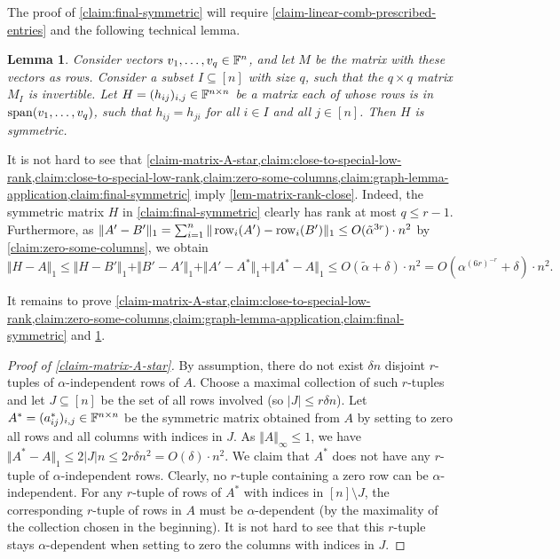 \documentclass{daj}
\theoremstyle{plain}
\theoremstyle{plain}
\newtheorem{lem}[thm]{Lemma}
\theoremstyle{plain}
\theoremstyle{plain}
\theoremstyle{definition}
\theoremstyle{plain}
\theoremstyle{plain}
\theoremstyle{definition}
\theoremstyle{definition}
\theoremstyle{plain}
\begin{document}
The proof of \cref{claim:final-symmetric} will require \cref{claim-linear-comb-prescribed-entries} and the following technical lemma.

\begin{lem}\label{lem:funny-matrix-symmetric}
Consider vectors $v_1,\dots, v_q\in \mathbb{F}^n$, and let $M$ be the matrix with these vectors as rows. Consider a subset $I\subseteq [n]$ with size $q$, such that the $q\times q$ matrix $M_I$ is invertible. Let $H=(h_{ij})_{i,j}\in \mathbb{F}^{n\times n}$ be a matrix each of whose rows is in $\operatorname{span}(v_1,\dots,v_q)$, such that $h_{ij}=h_{ji}$ for all $i\in I$ and all $j\in [n]$. Then $H$ is symmetric.
\end{lem}

It is not hard to see that \cref{claim-matrix-A-star,claim:close-to-special-low-rank,claim:close-to-special-low-rank,claim:zero-some-columns,claim:graph-lemma-application,claim:final-symmetric} imply \cref{lem-matrix-rank-close}. Indeed, the symmetric matrix $H$ in \cref{claim:final-symmetric} clearly has rank at most $q\leq r-1$. Furthermore, as $\Vert A'-B'\Vert_1=\sum_{i=1}^n \Vert \operatorname{row}_i(A')-\operatorname{row}_i(B')\Vert_1\leq  O(\tilde{\alpha}^{3r})\cdot n^2$ by \cref{claim:zero-some-columns}, we obtain
\[\Vert H-A\Vert_1\leq \Vert H-B'\Vert_1+\Vert B'-A'\Vert_1+\Vert A'-A^*\Vert_1+\Vert A^*-A\Vert_1\leq O(\tilde{\alpha}+\delta)\cdot n^2=O(\alpha^{(6r)^{-r}}+\delta)\cdot n^2.\]

It remains to prove \cref{claim-matrix-A-star,claim:close-to-special-low-rank,claim:zero-some-columns,claim:graph-lemma-application,claim:final-symmetric} and \cref{lem:funny-matrix-symmetric}.

\begin{proof}
[Proof of \cref{claim-matrix-A-star}]
By assumption, there do not exist $\delta n$ disjoint $r$-tuples of $\alpha$-independent rows of $A$. Choose a maximal collection of such $r$-tuples and let $J\subseteq [n]$ be the set of all rows involved (so $|J|\le r\delta n$). Let $A^*=(a^*_{ij})_{i,j}\in \mathbb{F}^{n\times n}$ be the symmetric matrix obtained from $A$ by setting to zero all rows and all columns with indices in $J$. As $\Vert A\Vert_\infty\le 1$, we have $
\Vert A^*-A\Vert_1\leq 2 \vert J\vert n\leq 2r \delta  n^2=O(\delta)\cdot n^2$. We claim that $A^*$ does not have any $r$-tuple of $\alpha$-independent rows. Clearly, no $r$-tuple containing a zero row can be $\alpha$-independent. For any $r$-tuple of rows of $A^*$ with indices in $[n]\setminus J$, the corresponding $r$-tuple of rows in $A$ must be $\alpha$-dependent (by the maximality of the collection chosen in the beginning). It is not hard to see that this $r$-tuple stays $\alpha$-dependent when setting to zero the columns with indices in $J$.
\end{proof}
\end{document}
